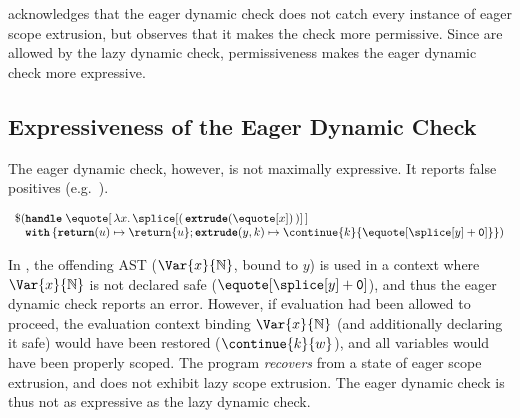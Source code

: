 \citet{kiselyov-14} acknowledges that the eager dynamic check does not catch every instance of eager scope extrusion, but observes that it makes the check more permissive. Since  are allowed by the lazy dynamic check, permissiveness makes the eager dynamic check more expressive. 

\subsection{Expressiveness of the Eager Dynamic Check}\label{subsection:eager-dynamic-expressiveness}
The eager dynamic check, however, is not maximally expressive. It reports false positives (e.g.\ ).

\begin{code} 
 \begin{source}
  $\begin{array}{l}
      \$ (\textbf{\texttt{handle}} \; \equote[\, {\lambda x. \, {\splice[(\, {{\textbf{\texttt{extrude}}(\equote[x])}} \, )]}}\,] \\
      \;\;\,\,\textbf{\texttt{with}} \, \{ \textbf{\texttt{return}}(u) \mapsto {\return{u}}; \textbf{\texttt{extrude}}(y, k) \mapsto {{\continue{k}{\equote[{\splice[y]} + \texttt{0}]}}}\})
    \end{array}$
 \end{source}
 \label{listing:eager-scope-extrusion-looks-unsafe}
\end{code}

In , the offending AST ($\Var{x}{\mathbb{N}}$, bound to $y$) is used in a context where $\Var{x}{\mathbb{N}}$ is not declared safe ($\equote[{\splice[y]} + \texttt{0}]$), and thus the eager dynamic check reports an error. However, if evaluation had been allowed to proceed, the evaluation context binding $\Var{x}{\mathbb{N}}$ (and additionally declaring it safe) would have been restored ($\continue{k}{w}$), and all variables would have been properly scoped. The program \textit{recovers} from a state of eager scope extrusion, and does not exhibit lazy scope extrusion. The eager dynamic check is thus not as expressive as the lazy dynamic check.

